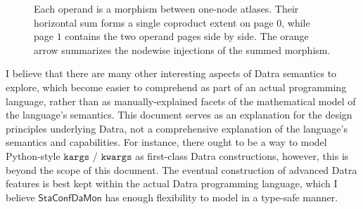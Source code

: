 \documentclass[11pt]{article}
\newcommand{\code}[1]{\texttt{#1}}
\newcommand{\StaConfDaMon}{\mathsf{StaConfDaMon}}
\newcommand{\HorSum}{\boxplus}
\begin{document}
\begin{figure}[htbp]
\caption{Each operand is a morphism between one-node atlases. Their
horizontal sum forms a single coproduct extent on page \(0\), while page
\(1\) contains the two operand pages side by side. The orange arrow
summarizes the nodewise injections of the summed morphism.}
\label{fig:horizontal-sum}
\end{figure}

I believe that there are many other interesting aspects of Datra semantics
to explore, which become easier to comprehend as part of an actual
programming language, rather than as manually-explained facets of the
mathematical model of the language's semantics. This document serves as an
explanation for the design principles underlying Datra, not a comprehensive
explanation of the language's semantics and capabilities. For instance,
there ought to be a way to model Python-style \(\code{kargs}\) /
\(\code{kwargs}\) as first-class Datra constructions, however, this is
beyond the scope of this document. The eventual construction of advanced
Datra features is best kept within the actual Datra programming language,
which I believe \(\StaConfDaMon\) has enough flexibility to model in a
type-safe manner.
\end{document}
